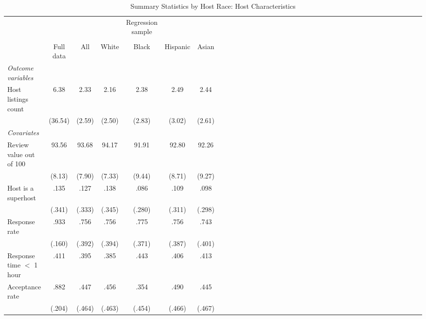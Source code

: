 {
	\begin{longtable}{l*{6}{c|c|cccc}}
		\caption{Summary Statistics by Host Race: Host Characteristics} \label{table:covariates}\\
		
		\hline
		&\multicolumn{1}{c}{}&\multicolumn{1}{c}{}&\multicolumn{1}{c}{}&\multicolumn{1}{c}{Regression sample}&\multicolumn{1}{c}{}&\multicolumn{1}{c}{}\\
		\cline{3-7}\\
			&\multicolumn{1}{c}{Full data}&\multicolumn{1}{c}{All}&\multicolumn{1}{c}{White}&\multicolumn{1}{c}{Black}&\multicolumn{1}{c}{Hispanic}&\multicolumn{1}{c}{Asian}\\
		\hline\hline           
		     
		\textit{Outcome variables} \\
		
		Host listings count         & 6.38 &     2.33  &      2.16&      2.38 &    2.49  & 2.44 \\
		& (36.54)	&     (2.59)         &     (2.50)         &     (2.83)         &     (3.02) & 	(2.61)         \\
		
		\textit{Covariates} \\

		\hline
		Review value out of 100      & 93.56  &      93.68	&      94.17	 	&      91.91		&    92.80	 & 		92.26\\
		              &   (8.13)   &     (7.90)         &     (7.33)         &     (9.44)         &     (8.71) 	&	 (9.27)         \\
		
		Host is a superhost    & .135   &      .127		&      .138 &      .086 &      .109 	& 	.098\\
		&(.341) & (.333)     &     (.345)         &     (.280)         &     (.311)         &     (.298)         \\

		Response rate      & .933  &       .756		&       .756		&      .775         &      .756  	& 	.743\\
		& (.160) &     (.392)         &     (.394)         &     (.371)         &     (.387)         &		(.401)\\

		Response time $<$ 1 hour      & .411  &       .395		&       .385		&      .443         &      .406  	& 	.413\\
		[1em]
		Acceptance rate      & .882    &      .447&      .456&       .354         &      .490    &	.445     \\
		&(.204) &     (.464)         &     (.463)         &     (.454)         &     (.466)         &		(.467)\\


\end{longtable}}
